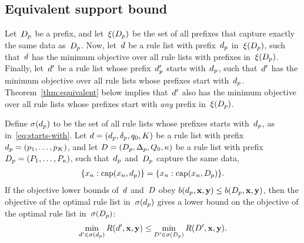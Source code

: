 \subsection{Equivalent support bound}
\label{sec:equivalent}

Let~$D_p$ be a prefix, and let~$\xi(D_p)$ be the set
of all prefixes that capture exactly the same data as~$D_p$.
%
Now, let~${d}$ be a rule list with prefix~$d_p$
in~$\xi(D_p)$, such that~${d}$ has the minimum objective
over all rule lists with prefixes in~$\xi(D_p)$.
%
Finally, let~${d}'$ be a rule list whose prefix~$d_p'$
starts with~$d_p$, such that~${d}'$ has the minimum objective
over all rule lists whose prefixes start with~$d_p$.
%
Theorem~\ref{thm:equivalent} below implies that~${d}'$ also has
the minimum objective over all rule lists whose prefixes start with
\emph{any} prefix in~$\xi(D_p)$.

\begin{theorem}
\label{thm:equivalent}
Define $\sigma(d_p)$ to be the set of all rule lists
whose prefixes starts with~$d_p$, as in~\eqref{eq:starts-with}.
%
Let ${{d} = (d_p, \delta_p, q_0, K)}$
be a rule list with prefix ${d_p = (p_1, \dots, p_K)}$,
and let ${{D} = (D_p, \Delta_p, Q_0, \kappa)}$
be a rule list with prefix ${D_p = (P_1, \dots, P_{\kappa})}$,
such that~$d_p$ and~$D_p$ capture the same data,~\ie
\begin{align}
\{x_n : \textnormal{cap}(x_n, d_p)\} = \{x_n : \textnormal{cap}(x_n, D_p)\}.
\end{align}
%
If the objective lower bounds of~${d}$ and~${D}$
obey ${b(d_p, \mathbf{x}, \mathbf{y}) \le b(D_p, \mathbf{x}, \mathbf{y})}$,
then the objective of the optimal rule list in~$\sigma(d_p)$ gives a
lower bound on the objective of the optimal rule list in~$\sigma(D_p)$:
\begin{align}
\min_{{d}' \in \sigma(d_p)} R({d}', \mathbf{x}, \mathbf{y})
\le \min_{{D}' \in \sigma(D_p)} R({D}', \mathbf{x}, \mathbf{y}).
\label{eq:permutation}
\end{align}
\end{theorem}

